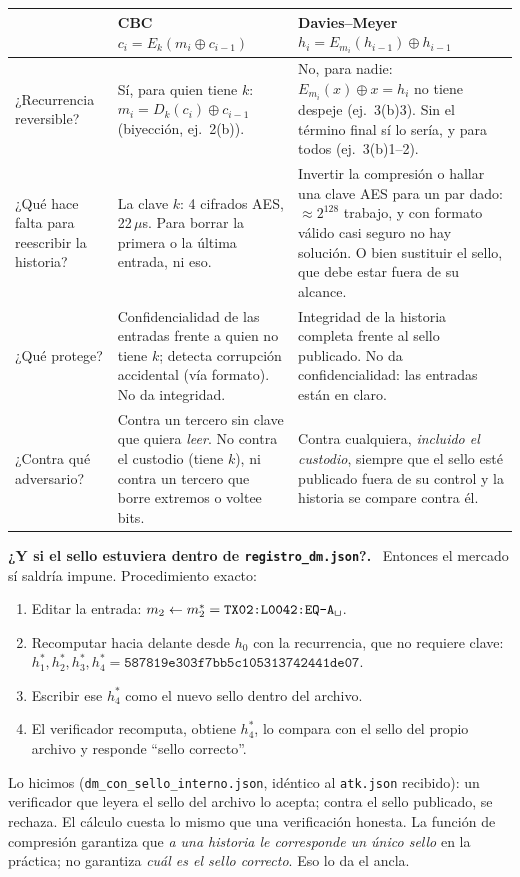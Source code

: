 \documentclass[11pt,letterpaper]{article}
\newcommand{\xor}{\oplus}
\newcommand{\paso}[1]{\par\smallskip\noindent\textbf{#1.}\ }
\begin{document}
\begin{center}
\renewcommand{\arraystretch}{1.3}
\begin{tabularx}{\linewidth}{>{\raggedright\arraybackslash}p{3.0cm}>{\raggedright\arraybackslash}X>{\raggedright\arraybackslash}X}
\toprule
 & \textbf{CBC} $c_i = E_k(m_i\xor c_{i-1})$ & \textbf{Davies--Meyer} $h_i = E_{m_i}(h_{i-1})\xor h_{i-1}$\\
\midrule
¿Recurrencia reversible? & Sí, para quien tiene $k$: $m_i = D_k(c_i)\xor c_{i-1}$ (biyección, ej.~2(b)). & No, para nadie: $E_{m_i}(x)\xor x=h_i$ no tiene despeje (ej.~3(b)3). Sin el término final sí lo sería, y para todos (ej.~3(b)1--2).\\
¿Qué hace falta para reescribir la historia? & La clave $k$: 4 cifrados AES, 22\,$\mu$s. Para borrar la primera o la última entrada, ni eso. & Invertir la compresión o hallar una clave AES para un par dado: $\approx2^{128}$ trabajo, y con formato válido casi seguro no hay solución. O bien sustituir el sello, que debe estar fuera de su alcance.\\
¿Qué protege? & Confidencialidad de las entradas frente a quien no tiene $k$; detecta corrupción accidental (vía formato). No da integridad. & Integridad de la historia completa frente al sello publicado. No da confidencialidad: las entradas están en claro.\\
¿Contra qué adversario? & Contra un tercero sin clave que quiera \emph{leer}. No contra el custodio (tiene $k$), ni contra un tercero que borre extremos o voltee bits. & Contra cualquiera, \emph{incluido el custodio}, siempre que el sello esté publicado fuera de su control y la historia se compare contra él.\\
\bottomrule
\end{tabularx}
\end{center}

\paso{¿Y si el sello estuviera dentro de \texttt{registro\_dm.json}?}
Entonces el mercado sí saldría impune. Procedimiento exacto:
\begin{enumerate}[itemsep=1pt]
  \item Editar la entrada: $m_2 \leftarrow m_2^* = \texttt{TX02:L0042:EQ-A\textvisiblespace}$.
  \item Recomputar hacia delante desde $h_0$ con la recurrencia, que no requiere clave:
        $h_1^*, h_2^*, h_3^*, h_4^* = \texttt{587819e303f7bb5c105313742441de07}$.
  \item Escribir ese $h_4^*$ como el nuevo sello dentro del archivo.
  \item El verificador recomputa, obtiene $h_4^*$, lo compara con el sello del propio archivo y responde ``sello correcto''.
\end{enumerate}
Lo hicimos (\texttt{dm\_con\_sello\_interno.json}, idéntico al \texttt{atk.json} recibido): un verificador que leyera el
sello del archivo lo acepta; contra el sello publicado, se rechaza. El cálculo cuesta lo mismo que una verificación
honesta. La función de compresión garantiza que \emph{a una historia le corresponde un único sello} en la práctica;
no garantiza \emph{cuál es el sello correcto}. Eso lo da el ancla.
\end{document}
